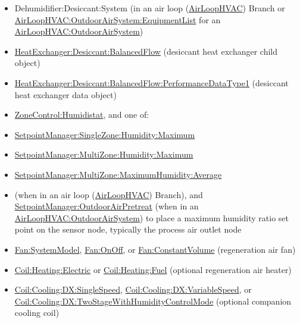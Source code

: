 \begin{itemize}
\item
  Dehumidifier:Desiccant:System (in an air loop (\hyperref[airloophvac]{AirLoopHVAC}) Branch or \hyperref[airloophvacoutdoorairsystemequipmentlist]{AirLoopHVAC:OutdoorAirSystem:EquipmentList} for an \hyperref[airloophvacoutdoorairsystem]{AirLoopHVAC:OutdoorAirSystem})
\item
  \hyperref[heatexchangerdesiccantbalancedflow]{HeatExchanger:Desiccant:BalancedFlow} (desiccant heat exchanger child object)
\item
  \hyperref[heatexchangerdesiccantbalancedflowperformancedatatype1]{HeatExchanger:Desiccant:BalancedFlow:PerformanceDataType1} (desiccant heat exchanger data object)
\item
  \hyperref[zonecontrolhumidistat]{ZoneControl:Humidistat}, and one of:
\item
  \hyperref[setpointmanagersinglezonehumiditymaximum]{SetpointManager:SingleZone:Humidity:Maximum}
\item
  \hyperref[setpointmanagermultizonehumiditymaximum]{SetpointManager:MultiZone:Humidity:Maximum}
\item
  \hyperref[setpointmanagermultizonemaximumhumidityaverage]{SetpointManager:MultiZone:MaximumHumidity:Average}
\item
  (when in an air loop (\hyperref[airloophvac]{AirLoopHVAC}) Branch), and \hyperref[setpointmanageroutdoorairpretreat]{SetpointManager:OutdoorAirPretreat} (when in an \hyperref[airloophvacoutdoorairsystem]{AirLoopHVAC:OutdoorAirSystem}) to place a maximum humidity ratio set point on the sensor node, typically the process air outlet node
\item
  \hyperref[fansystemmodel]{Fan:SystemModel}, \hyperref[fanonoff]{Fan:OnOff}, or \hyperref[fanconstantvolume]{Fan:ConstantVolume} (regeneration air fan)
\item
  \hyperref[coilheatingelectric]{Coil:Heating:Electric} or \hyperref[coilheatinggas-000]{Coil:Heating:Fuel} (optional regeneration air heater)
\item
  \hyperref[coilcoolingdxsinglespeed]{Coil:Cooling:DX:SingleSpeed}, \hyperref[coilcoolingdxvariablespeed]{Coil:Cooling:DX:VariableSpeed}, or \hyperref[coilcoolingdxtwostagewithhumiditycontrolmode]{Coil:Cooling:DX:TwoStageWithHumidityControlMode} (optional companion cooling coil)
\end{itemize}


